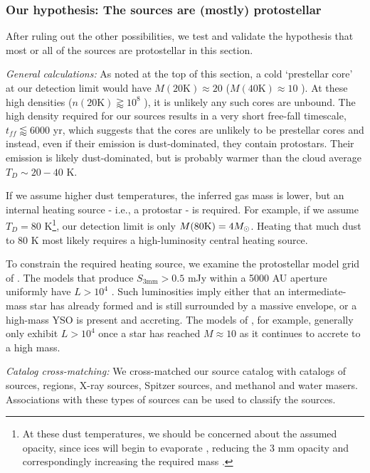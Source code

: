 \documentclass[twocolumn]{aastex61}
\begin{document}
\subsubsection{Our hypothesis: The sources are (mostly) protostellar}
\label{sec:theyareprotostars}
After ruling out the other possibilities, we test and validate the hypothesis
that most or all of the sources are protostellar in this section.


\emph{General calculations:}
As noted at the top of this section, a cold `prestellar core' at our detection
limit would have $M(20\mathrm{K})\approx20$ \msun ($M(40\mathrm{K})\approx10$
\msun).  At these high densities ($n(20 \mathrm{K})\gtrapprox10^8$ \percc), it
is unlikely any
such cores are unbound.  The high density required for our sources results in a very short
free-fall timescale, $t_{ff}\lessapprox6000$ yr, which suggests that the cores
are unlikely to be prestellar cores and instead, even if their emission is
dust-dominated, they contain protostars.  Their emission is likely
dust-dominated, but is probably warmer than the cloud average $T_D\sim20-40$ K.  

If we assume higher dust temperatures, the inferred gas mass is lower, but an
internal heating source - i.e., a protostar - is required.  For example,
if we assume $T_D=80$ K\footnote{At these dust temperatures,
we should be concerned about the assumed opacity, since ices
will begin to evaporate  \citep[e.g.,][]{Bergin1995a}, reducing the 3 mm
opacity and correspondingly increasing the required mass
\citep{Ossenkopf1994a}.  }, our detection limit is only $M(80\mathrm{K}) = 4
M_{\odot}$.  Heating that much dust to 80 K most likely requires a high-luminosity
central heating source.

To constrain the required heating source, we examine the protostellar model grid
of \citet{Robitaille2017a}.  The models that produce $S_{3 \mathrm{mm}} > 0.5$
mJy within a 5000 AU aperture uniformly have $L>10^4$ \lsun.  Such luminosities
imply either that an intermediate-mass star has already formed and is still
surrounded by a massive envelope, or a high-mass YSO is present and accreting.
The models of \citet{Zhang2015f}, for example, generally only exhibit $L>10^4$
\lsun once a star has reached $M\approx10$ \msun as it continues to accrete to
a high mass.



\emph{Catalog cross-matching:}
We cross-matched our source catalog with catalogs of \ammonia sources, \hii
regions, X-ray sources, Spitzer sources, and methanol and water masers.
Associations with these types of sources can be used to classify the sources.
\end{document}
